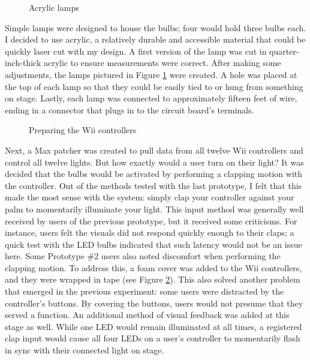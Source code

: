 \begin{figure}
	\centering

	\hspace{0.1cm}

	\caption{Acrylic lamps}

	\label{prototyping3.5}
\end{figure}

Simple lamps were designed to house the bulbs; four would hold three bulbs each. I decided to use acrylic, a relatively durable and accessible material that could be quickly laser cut with my design. A first version of the lamp was cut in quarter-inch-thick acrylic to ensure measurements were correct. After making some adjustments, the lamps pictured in Figure \ref{prototyping3.5} were created. A hole was placed at the top of each lamp so that they could be easily tied to or hung from something on stage. Lastly, each lamp was connected to approximately fifteen feet of wire, ending in a connector that plugs in to the circuit board's terminals.

\begin{figure}
	\centering

	\hspace{0.1cm}

	\caption{Preparing the Wii controllers}

	\label{prototyping3.6}
\end{figure}

Next, a Max patcher was created to pull data from all twelve Wii controllers and control all twelve lights. But how exactly would a user turn on their light? It was decided that the bulbs would be activated by performing a clapping motion with the controller. Out of the methods tested with the last prototype, I felt that this made the most sense with the system: simply clap your controller against your palm to momentarily illuminate your light. This input method was generally well received by users of the previous prototype, but it received some criticisms. For instance, users felt the visuals did not respond quickly enough to their claps; a quick test with the LED bulbs indicated that such latency would not be an issue here. Some Prototype \#2 users also noted discomfort when performing the clapping motion. To address this, a foam cover was added to the Wii controllers, and they were wrapped in tape (see Figure \ref{prototyping3.6}). This also solved another problem that emerged in the previous experiment: some users were distracted by the controller's buttons. By covering the buttons, users would not presume that they served a function. An additional method of visual feedback was added at this stage as well. While one LED would remain illuminated at all times, a registered clap input would cause all four LEDs on a user's controller to momentarily flash in sync with their connected light on stage.

